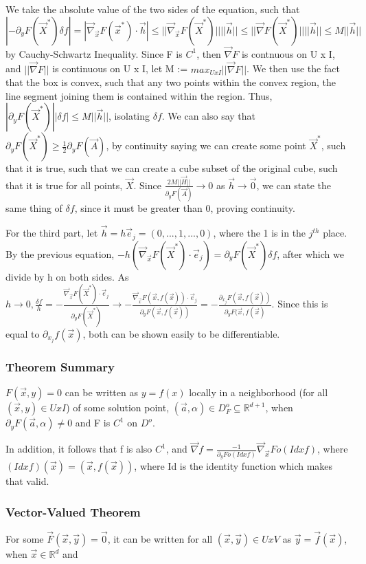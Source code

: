 \documentclass[11 pt, twoside]{article}
\begin{document}
We take the absolute value of the two sides of the equation, such that $|-\partial_yF(\vec{X}^*)\delta f| = |\vec{\nabla}_\vec{x}F(\vec{x}^*) \cdot \vec{h}| \leq ||\vec{\nabla}_\vec{x}F(\vec{X}^*)||||\vec{h}|| \leq ||\vec{\nabla}F(\vec{X}^*)||||\vec{h}|| \leq M||\vec{h}||$ by Cauchy-Schwartz Inequality. Since F is $C^1$, then $\vec{\nabla}F$ is contnuous on U x I, and $||\vec{\nabla}F||$ is continuous on U x I, let M := $max_{UxI}||\vec{\nabla}F||$. We then use the fact that the box is convex, such that any two points within the convex region, the line segment joining them is contained within the region. Thus, $|\partial_yF(\vec{X}^*)||\delta f| \leq M||\vec{h}||$, isolating $\delta f$. We can also say that $\partial_y F(\vec{X}^*) \geq \frac{1}{2}\partial_yF(\vec{A})$, by continuity saying we can create some point $\vec{X}^*$, such that it is true, such that we can create a cube subset of the original cube, such that it is true for all points, $\vec{X}$. Since $\frac{2M||\vec{H}||}{\partial_yF(\vec{A})} \to 0$ as $\vec{h} \to \vec{0}$, we can state the same thing of $\delta f$, since it must be greater than 0, proving continuity.

For the third part, let $\vec{h} = h\vec{e}_j = (0, ..., 1, ..., 0)$, where the 1 is in the $j^{th}$ place. By the previous equation, $-h(\vec{\nabla}_\vec{x}F(\vec{X}^*) \cdot \vec{e}_j) = \partial_yF(\vec{X}^*)\delta f$, after which we divide by h on both sides. As $h \to 0, \frac{\delta f}{h} = -\frac{\vec{\nabla}_\vec{x}F(\vec{X}^*) \cdot \vec{e}_j}{\partial_y F(\vec{X}^*)} \to -\frac{\vec{\nabla}_\vec{x}F(\vec{x}, f(\vec{x})) \cdot \vec{e}_j}{\partial_yF(\vec{x}, f(\vec{x}))} = -\frac{\partial_{x_j}F(\vec{x}, f(\vec{x}))}{\partial_yF(\vec{x}, f(\vec{x})}.$ Since this is equal to $\partial_{x_j}f(\vec{x})$, both can be shown easily to be differentiable.

\subsubsection{Theorem Summary}
$F(\vec{x}, y) = 0$ can be written as $y = f(x)$ locally in a neighborhood (for all $(\vec{x}, y) \in U x I$) of some solution point, $(\vec{a}, \alpha) \in D_F^o \subseteq \mathbb{R}^{d+1}$, when $\partial_yF(\vec{a}, \alpha) \neq 0$ and F is $C^1$ on $D^o$.

In addition, it follows that f is also $C^1$, and $\vec{\nabla}f = \frac{-1}{\partial_yF o (Id x f)}\vec{\nabla}_\vec{x}F o (Id x f)$, where $(Id x f)(\vec{x}) = (\vec{x}, f(\vec{x}))$, where Id is the identity function which makes that valid.

\subsubsection{Vector-Valued Theorem}
For some $\vec{F}(\vec{x}, \vec{y}) = \vec{0}$, it can be written for all $(\vec{x}, \vec{y}) \in U x V$ as $\vec{y} = \vec{f}(\vec{x})$, when $\vec{x} \in \mathbb{R}^d$ and 
\end{document}
